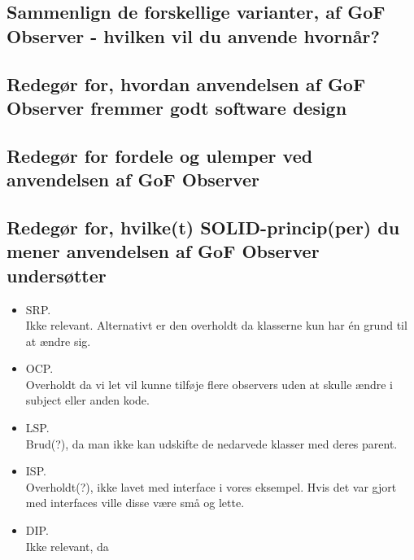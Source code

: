 \subsection{Sammenlign de forskellige varianter, af GoF Observer - hvilken vil du anvende hvornår?}

\subsection{Redegør for, hvordan anvendelsen af GoF Observer fremmer godt software design}

\subsection{Redegør for fordele og ulemper ved anvendelsen af GoF Observer}


\subsection{Redegør for, hvilke(t) SOLID-princip(per) du mener anvendelsen af GoF Observer undersøtter}

\begin{itemize}
	\item SRP.\\
	Ikke relevant. Alternativt er den overholdt da klasserne kun har én grund til at ændre sig.
	\item OCP.\\
	Overholdt da vi let vil kunne tilføje flere observers uden at skulle ændre i subject eller anden kode.
	\item LSP.\\
	Brud(?), da man ikke kan udskifte de nedarvede klasser med deres parent.
	\item ISP.\\
	Overholdt(?), ikke lavet med interface i vores eksempel. Hvis det var gjort med interfaces ville disse være små og lette. 
	\item DIP.\\
	Ikke relevant, da 
\end{itemize}